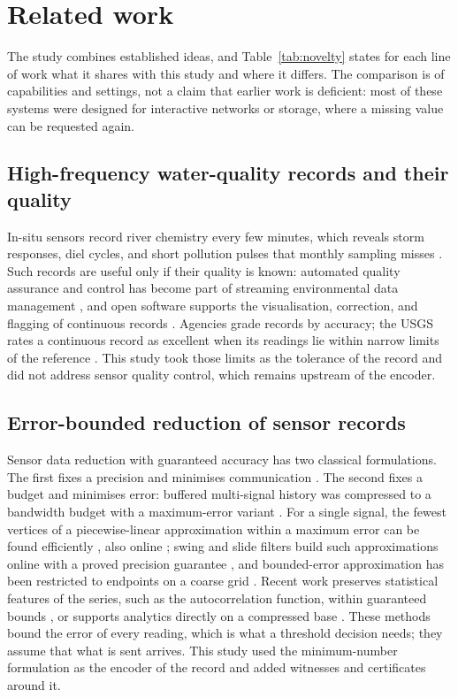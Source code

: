 \section{Related work}
\label{sec:related}

The study combines established ideas, and Table~\ref{tab:novelty} states for each line of work what it shares with this study and where it differs. The comparison is of capabilities and settings, not a claim that earlier work is deficient: most of these systems were designed for interactive networks or storage, where a missing value can be requested again.

\subsection{High-frequency water-quality records and their quality}
In-situ sensors record river chemistry every few minutes, which reveals storm responses, diel cycles, and short pollution pulses that monthly sampling misses \citep{rode2016}. Such records are useful only if their quality is known: automated quality assurance and control has become part of streaming environmental data management \citep{campbell2013}, and open software supports the visualisation, correction, and flagging of continuous records \citep{horsburgh2015}. Agencies grade records by accuracy; the USGS rates a continuous record as excellent when its readings lie within narrow limits of the reference \citep{wagner2006}. This study took those limits as the tolerance of the record and did not address sensor quality control, which remains upstream of the encoder.

\subsection{Error-bounded reduction of sensor records}
Sensor data reduction with guaranteed accuracy has two classical formulations. The first fixes a precision and minimises communication \citep{olston2003,deligiannakis2004}. The second fixes a budget and minimises error: buffered multi-signal history was compressed to a bandwidth budget with a maximum-error variant \citep{deligiannakis2007}. For a single signal, the fewest vertices of a piecewise-linear approximation within a maximum error can be found efficiently \citep{imai1988,orourke1981}, also online \citep{soroush2008}; swing and slide filters build such approximations online with a proved precision guarantee \citep{elmeleegy2009swing}, and bounded-error approximation has been restricted to endpoints on a coarse grid \citep{lin2019,lin2025}. Recent work preserves statistical features of the series, such as the autocorrelation function, within guaranteed bounds \citep{munizcuza2025cameo}, or supports analytics directly on a compressed base \citep{sun2025shrink}. These methods bound the error of every reading, which is what a threshold decision needs; they assume that what is sent arrives. This study used the minimum-number formulation as the encoder of the record and added witnesses and certificates around it.

